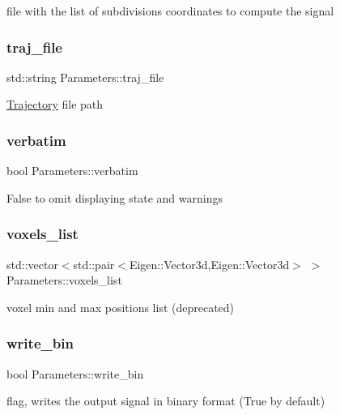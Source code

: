 file with the list of subdivisions coordinates to compute the signal \mbox{\label{class_parameters_a75346dc3b7a41548a2f9e0560343df24}} 
\subsubsection{\texorpdfstring{traj\+\_\+file}{traj\_file}}
{\footnotesize\ttfamily std\+::string Parameters\+::traj\+\_\+file}

\hyperlink{class_trajectory}{Trajectory} file path \mbox{\label{class_parameters_aabce43eb8376a94a8e765da99b58d003}} 
\subsubsection{\texorpdfstring{verbatim}{verbatim}}
{\footnotesize\ttfamily bool Parameters\+::verbatim}

False to omit displaying state and warnings \mbox{\label{class_parameters_aefbd07d8501ebb9311bbb1ea7c37be26}} 
\subsubsection{\texorpdfstring{voxels\+\_\+list}{voxels\_list}}
{\footnotesize\ttfamily std\+::vector$<$std\+::pair$<$Eigen\+::\+Vector3d,Eigen\+::\+Vector3d$>$ $>$ Parameters\+::voxels\+\_\+list}

voxel min and max positions list (deprecated) \mbox{\label{class_parameters_a4c98120687d1ba332d0c6cd5a14c59fb}} 
\subsubsection{\texorpdfstring{write\+\_\+bin}{write\_bin}}
{\footnotesize\ttfamily bool Parameters\+::write\+\_\+bin}

flag, writes the output signal in binary format (True by default) \mbox{\label{class_parameters_ac9408092b6254b4ccfecc85decbb1944}} 
